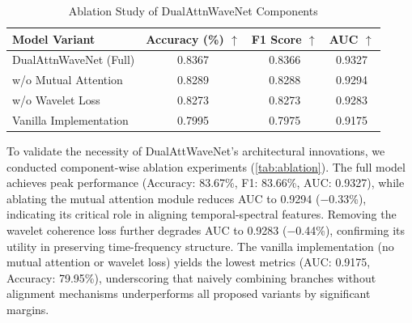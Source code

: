 \documentclass[12pt]{article}
\begin{document}
\begin{table}[htbp]
    \caption{Ablation Study of DualAttnWaveNet Components}
    \label{tab:ablation}
    \centering
    \begin{tabular}{lccc}
        \toprule
        \textbf{Model Variant} & \textbf{Accuracy (\%)} $\uparrow$ & \textbf{F1 Score} $\uparrow$ & \textbf{AUC} $\uparrow$ \\
        \midrule
        DualAttnWaveNet (Full) & 0.8367                            & 0.8366                       & 0.9327                  \\
        \cmidrule{1-4}
        w/o Mutual Attention   & 0.8289                            & 0.8288                       & 0.9294                  \\
        w/o Wavelet Loss       & 0.8273                            & 0.8273                       & 0.9283                  \\
        Vanilla Implementation & 0.7995                            & 0.7975                       & 0.9175                  \\
        \bottomrule
    \end{tabular}
    \vspace{2pt}

\end{table}

To validate the necessity of DualAttWaveNet’s architectural innovations, we conducted component-wise ablation experiments (\autoref{tab:ablation}). The full model achieves peak performance (Accuracy: 83.67\%, F1: 83.66\%, AUC: 0.9327), while ablating the mutual attention module reduces AUC to 0.9294 (−0.33\%), indicating its critical role in aligning temporal-spectral features. Removing the wavelet coherence loss further degrades AUC to 0.9283 (−0.44\%), confirming its utility in preserving time-frequency structure. The vanilla implementation (no mutual attention or wavelet loss) yields the lowest metrics (AUC: 0.9175, Accuracy: 79.95\%), underscoring that naively combining branches without alignment mechanisms underperforms all proposed variants by significant margins.




\printbibliography
\end{document}
